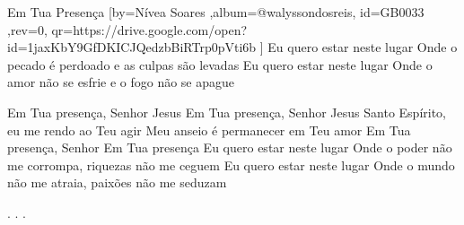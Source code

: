 \beginsong
{Em Tua Presença %
}[by={Nívea Soares %
},album={@walyssondosreis},
id={GB0033 %
},rev={0}, %
qr={https://drive.google.com/open?id=1jaxKbY9GfDKICJQedzbBiRTrp0pVti6b %
}]
\beginverse*
Eu quero estar neste lugar
Onde o pecado é perdoado e as culpas são levadas
Eu quero estar neste lugar
Onde o amor não se esfrie e o fogo não se apague
\endverse

\beginverse*
Em Tua presença, Senhor Jesus
Em Tua presença, Senhor Jesus
\endverse
\beginverse*
Santo Espírito, eu me rendo ao Teu agir
Meu anseio é permanecer em Teu amor
\endverse
\beginchorus
Em Tua presença, Senhor
Em Tua presença
\endchorus
\beginverse*
Eu quero estar neste lugar
Onde o poder não me corrompa, riquezas não me ceguem
Eu quero estar neste lugar
Onde o mundo não me atraia, paixões não me seduzam
\endverse

\beginverse*\color{white}
.
.
.
\endverse
\begin{comment}
\lstset{basicstyle=\scriptsize\bf} %
\tab{Solo 1}
\begin{lstlisting}
E|-----------------------------------------------------|
B|-----------------------------------------------------|
G|-----------------------------------------------------|
D|-----------------------------------------------------|
A|-----------------------------------------------------|
E|-----------------------------------------------------|
\end{lstlisting}
\end{comment}
 
